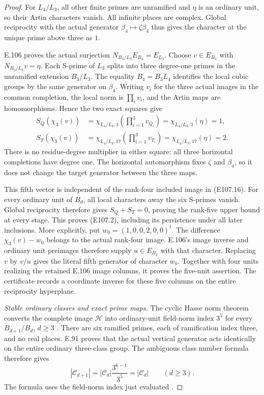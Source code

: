 \begin{proof}
For \(L_4/L_3\), all other finite primes are unramified and
\(\eta\) is an ordinary unit, so their Artin characters vanish.
All infinite places are complex. Global reciprocity with the
actual generator \(\beta_4\mapsto\zeta\beta_4\) thus gives
the character at the unique prime above three as \(1\).

E.106 proves the actual surjection
\(N_{B_3/L_3}E_{B_3}=E_{L_3}\). Choose \(v\in E_{B_3}\)
with \(N_{B_3/L_3}v=\eta\). Each S-prime of \(L_3\) splits
into three degree-one primes in the unramified extension
\(B_3/L_3\). The equality \(B_4=B_3L_4\) identifies the local
cubic groups by the same generator on \(\beta_4\).
Writing \(v_i\) for the three actual images in the common
completion, the local norm is \(\prod_i v_i\), and the
Artin maps are homomorphisms. Hence the two exact squares give
\[
 \begin{aligned}
 S_Q(\chi_3(v))
   &=\chi_{L_4/L_3,3}\left(\prod_{i=1}^3v_{Q_i}\right)
     =\chi_{L_4/L_3,3}(\eta)=1,\\
 S_T(\chi_3(v))
   &=\chi_{L_4/L_3,17}\left(\prod_{i=1}^3v_{T_i}\right)
     =\chi_{L_4/L_3,17}(\eta)=2 .
 \end{aligned}
 \tag{E107.19}
\]
There is no residue-degree multiplier in either square:
all three horizontal completions have degree one. The
horizontal automorphism fixes \(\zeta\) and \(\beta_4\), so
it does not change the target generator between the three maps.

This fifth vector is independent of the rank-four included image
in (E107.16). For every ordinary unit of \(B_d\), all local
characters away the six S-primes vanish. Global reciprocity
therefore gives \(S_Q+S_T=0\), proving the rank-five upper
bound at every stage. This proves (E107.2), including its
persistence under all later inclusions.
More explicitly, put \(w_0=(1,0,0,2,0,0)^t\).
The difference \(\chi_3(v)-w_0\) belongs to the actual rank-four
image. E.106's image inverse and ordinary unit preimages
therefore supply \(u\in E_{B_2}\) with that character.
Replacing \(v\) by \(v/u\) gives the literal fifth generator
of character \(w_0\). Together with four units realizing
the retained E.106 image columns, it proves the five-unit
assertion. The certificate records a coordinate inverse
for these five columns on the entire reciprocity hyperplane.

\emph{Stable ordinary classes and exact prime maps.}
The cyclic Hasse norm theorem converts the complete image
\(\mathcal H\) into ordinary-unit field-norm index \(3^5\)
for every \(B_{d+1}/B_d\), \(d\ge3\)
\cite[VIII,Theorem3.1 and proof]{E_MilneCFT}.
There are six ramified primes, each of ramification index three,
and no real places. E.91 proves that the actual vertical generator
acts identically on the entire ordinary three-class group.
The ambiguous class number formula therefore gives
\[
                  |\mathcal C_{d+1}|
                    =|\mathcal C_d|\frac{3^{6-1}}{3^5}
                    =|\mathcal C_d|\qquad(d\ge3).
 \tag{E107.20}
\]
The formula uses the field-norm index just evaluated
\cite[Theorem1(1) and its ideal/Herbrand derivation]{E_LemmermeyerAmbiguous}.


\end{proof}
